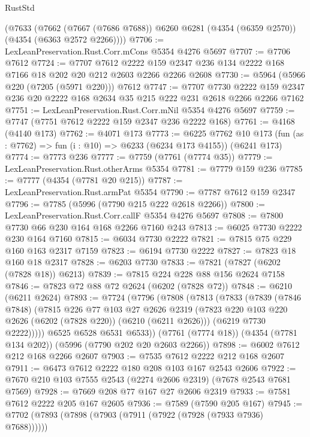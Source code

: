 \begin{lexlean}{RustStd}
\begin{coremodule}
    (@7633
      (@7662 (@7667 (@7686 @7688)) @6260 @6281 (@4354 (@6359 @2570)) (@4354 (@6363 @2572 @2266))))
@7706 := LexLeanPreservation.Rust.Corr.mCons @5354 @4276 @5697
@7707 := @7706 @7612
@7724 := @7707
    @7612
    @2222
    @159
    @2347
    @236
    @134
    @2222
    @168
    @7166
    @18
    @202
    @20
    @212
    @2603
    @2266
    @2266
    @2608
@7730 := @5964 (@5966 @220 (@7205 (@5971 @220))) @7612
@7747 := @7707
    @7730
    @2222
    @159
    @2347
    @236
    @20
    @2222
    @168
    @2634
    @35
    @215
    @222
    @231
    @2618
    @2266
    @2266
    @7162
@7751 := LexLeanPreservation.Rust.Corr.mNil @5354 @4276 @5697
@7759 := @7747 (@7751 @7612 @2222 @159 @2347 @236 @2222 @168)
@7761 := @4168 (@4140 @173)
@7762 := @4071 @173
@7773 := @6225
    @7762
    @10
    @173
    (fun (as : @7762) => fun (i : @10) => @6233 (@6234 @173 @4155))
    (@6241 @173)
@7774 := @7773 @236
@7777 := @7759 (@7761 (@7774 @35))
@7779 := LexLeanPreservation.Rust.otherArms @5354
@7781 := @7779 @159 @236
@7785 := @7777 (@4354 (@7781 @20 @215))
@7787 := LexLeanPreservation.Rust.armPat @5354
@7790 := @7787 @7612 @159 @2347
@7796 := @7785 (@5996 (@7790 @215 @222 @2618 @2266))
@7800 := LexLeanPreservation.Rust.Corr.callF @5354 @4276 @5697
@7808 := @7800 @7730 @66 @230 @164 @168 @2266 @7160 @243
@7813 := @6025 @7730 @2222 @230 @164 @7160
@7815 := @6034 @7730 @2222
@7821 := @7815 @75 @229 @160 @163 @2317 @7159
@7823 := @6194 @7730 @2222
@7827 := @7823 @18 @160 @18 @2317
@7828 := @6203 @7730
@7833 := @7821 (@7827 (@6202 (@7828 @18)) @6213)
@7839 := @7815 @224 @228 @88 @156 @2624 @7158
@7846 := @7823 @72 @88 @72 @2624 (@6202 (@7828 @72))
@7848 := @6210 (@6211 @2624)
@7893 := @7724
    (@7796
      (@7808
        (@7813
          (@7833
            (@7839
              (@7846 @7848)
              (@7815
                @226
                @77
                @103
                @27
                @2626
                @2319
                (@7823 @220 @103 @220 @2626 (@6202 (@7828 @220)) (@6210 (@6211 @2626)))
                (@6219 @7730 @2222)))))
        @6525
        @6528
        @6531
        @6533))
    (@7761 (@7774 @18))
    (@4354 (@7781 @134 @202))
    (@5996 (@7790 @202 @20 @2603 @2266))
@7898 := @6002 @7612 @212 @168 @2266 @2607
@7903 := @7535 @7612 @2222 @212 @168 @2607
@7911 := @6473 @7612 @2222 @180 @208 @103 @167 @2543 @2606
@7922 := @7670 @210 @103 @7555 @2543 (@2274 @2606 @2319) (@7678 @2543 @7681 @7569)
@7928 := @7669 @208 @77 @167 @27 @2606 @2319
@7933 := @7581 @7612 @2222 @205 @167 @2605
@7936 := @7589 (@7590 @205 @167)
@7945 := @7702 (@7893 (@7898 (@7903 (@7911 (@7922 (@7928 (@7933 @7936) @7688))))))

\end{coremodule}
\end{lexlean}
